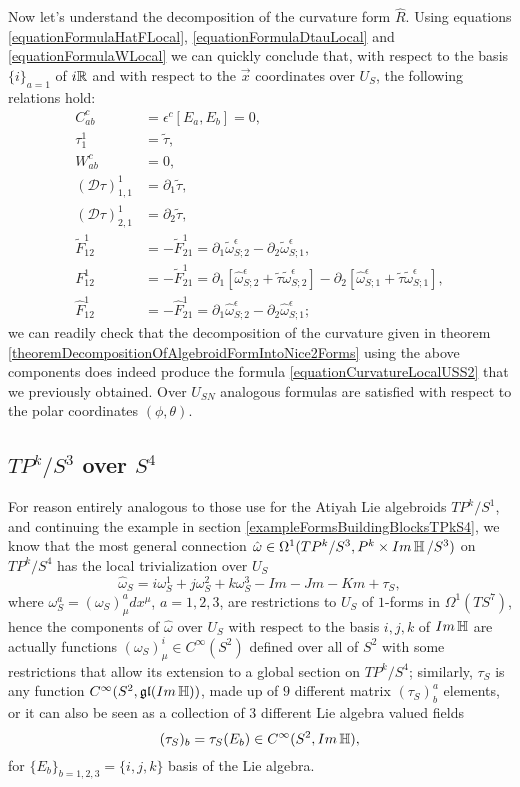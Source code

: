 Now let's understand the decomposition of the curvature form $\hat R$. Using equations \eqref{equationFormulaHatFLocal}, \eqref{equationFormulaDtauLocal} and \eqref{equationFormulaWLocal} we can quickly conclude that, with respect to the basis $\{i\}_{a = 1}$ of $i\mathbb{R}$ and with respect to the $\vec x$ coordinates over $U_S$, the following relations hold:
\begin{align*}
    C^c_{ab} &= \epsilon^c[E_a, E_b] = 0,\\
    \tau^1_1 &= \tilde \tau,\\
    W_{ab}^c &= 0,\\
    (\mathcal D \tau)^1_{1,1} &= \partial_1 \tilde \tau,\\
    (\mathcal D \tau)^1_{2,1} &= \partial_2 \tilde \tau,\\
    \tilde F^1_{12} &= - \tilde F^1_{21} = \partial_{1} \tilde \omega^\epsilon_{S;2} - \partial_{2} \tilde \omega^\epsilon_{S;1},\\
    F^1_{12} &= - \tilde F^1_{21} = \partial_{1} [\hat \omega^\epsilon_{S;2} + \tilde \tau \tilde \omega^\epsilon_{S;2}] - \partial_{2} [\hat \omega^\epsilon_{S;1} + \tilde \tau \tilde \omega^\epsilon_{S;1}],\\
    \hat F^1_{12} &= - \hat F^1_{21} = \partial_{1} \hat \omega^\epsilon_{S;2} - \partial_{2} \hat \omega^\epsilon_{S;1};
\end{align*}
we can readily check that the decomposition of the curvature given in theorem \ref{theoremDecompositionOfAlgebroidFormIntoNice2Forms} using the above components does indeed produce the formula \eqref{equationCurvatureLocalUSS2} that we previously obtained. Over $U_{SN}$ analogous formulas are satisfied with respect to the polar coordinates $(\phi, \theta)$.


\subsection{$TP^k/S^3$ over $S^4$}\label{subsectionConnectionsTPkS3}

For reason entirely analogous to those use for the Atiyah Lie algebroids $TP^k/S^1$, and continuing the example in section \ref{exampleFormsBuildingBlocksTPkS4}, we know that the most general connection $\hat \omega \in \Omega^1
(TP^k/S^3, P^k \times Im \operatorname{\mathbb{H}}/S^3)$ on $TP^k/S^4$ has the local trivialization over $U_S$
\begin{equation}
    \hat \omega_S = i \omega_S^1 + j \omega_S^2 + k \omega_S^3 - Im - Jm - Km + \tau_S,
\end{equation}
where $\omega_S^a = (\omega_S)^a_\mu dx^\mu$, $a = 1, 2, 3$, are restrictions to $U_S$ of $1$-forms in $\Omega^1(TS^7)$, hence the components of $\hat \omega$ over $U_S$ with respect to the basis $i, j, k$ of $Im \operatorname{\mathbb{H}}$ are actually functions $(\omega_S)^i_\mu \in C^\infty(S^2)$ defined over all of $S^2$ with some restrictions that allow its extension to a global section on $TP^k/S^4$; similarly, $\tau_S$ is any function $C^\infty(S^2, \mathfrak{gl}(Im \operatorname{\mathbb{H}}))$, made up of $9$ different matrix $(\tau_S)^a_b$ elements, or it can also be seen as a collection of $3$ different Lie algebra valued fields $$(\tau_S)_b = \tau_S(E_b) \in C^\infty(S^2, Im \operatorname{\mathbb{H}}),$$ for $\{E_b\}_{b = 1, 2, 3} = \{i, j, k\}$ basis of the Lie algebra.

